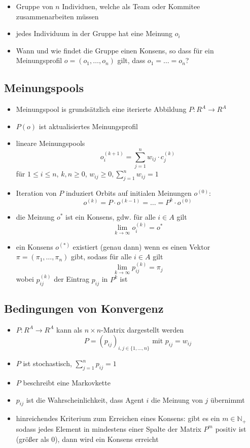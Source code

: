 \begin{itemize}
	\item Gruppe von $n$ Individuen, welche als Team oder Kommitee zusammenarbeiten müssen
	\item jedes Individuum in der Gruppe hat eine Meinung $o_i$
	\item Wann und wie findet die Gruppe einen Konsens, so dass für ein Meinungsprofil $o=(o_1,\dots,o_n)$ gilt, dass $o_1=\dots=o_n$?
\end{itemize}
\subsection{Meinungspools}
\begin{itemize}
	\item Meinungspool is grundsätzlich eine iterierte Abbildung $P:R^A\rightarrow R^A$
	\item $P(o)$ ist aktualisiertes Meinungsprofil
	\item lineare Meinungspools
		\[o_i^{(k+1)}=\sum\limits_{j=1}^n w_{ij}\cdot c_j^{(k)}\]
		für $1\leq i\leq n$, $k,n\geq 0$, $w_{ij}\geq 0, \sum\limits_{j=1}^n w_{ij}=1$
\end{itemize}
\topbreak
\vspace*{-\baselineskip}
\begin{itemize}
	\item Iteration von $P$ induziert Orbits auf initialen Meinungen $o^{(0)}$:
		\[o^{(k)} = P\cdot o^{(k-1)} = \dots = P^k\cdot o^{(0)}\]
	\item die Meinung $o^{*}$ ist ein Konsens, gdw. für alle $i\in A$ gilt
		\[\lim_{k\rightarrow\infty} o_i^{(k)}=o^{*}\]
	\item ein Konsens $o^{(*)}$ existiert (genau dann) wenn es einen Vektor $\pi=(\pi_1,\dots,\pi_n)$ gibt, sodass für alle $i\in A$ gilt
		\[\lim_{k\rightarrow\infty} p_{ij}^{(k)}=\pi_j\]
	wobei $p_{ij}^{(k)}$ der Eintrag $p_{ij}$ in $P^k$ ist
\end{itemize}
\subsection{Bedingungen von Konvergenz}
\begin{itemize}
\setlength{\itemsep}{0pt}
	\item $P : R^A \rightarrow R^A$ kann als $n\times n$-Matrix dargestellt werden
		\[P=(p_{ij})_{i,j\in\{1,\dots,n\}}\text{ mit }p_{ij}=w_{ij}\]
	\item $P$ ist stochastisch, $\sum\limits_{j=1}^n p_{ij} =1$
	\item $P$ beschreibt eine Markovkette
	\item $p_{ij}$ ist die Wahrscheinlichkeit, dass Agent $i$ die Meinung von $j$ übernimmt
	\item hinreichendes Kriterium zum Erreichen eines Konsens: gibt es ein $m\in\mathbb{N}_+$ sodass jedes Element in mindestens einer Spalte der Matrix $P^m$ positiv ist (größer als $0$), dann wird ein Konsens erreicht
\end{itemize}